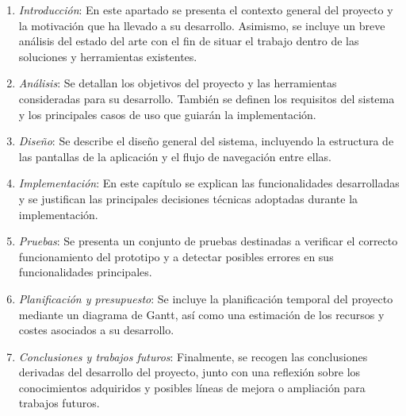 \documentclass[../../main.tex]{subfiles}
\begin{document}
\begin{enumerate}
    \item \textit{Introducción}: En este apartado se presenta el contexto general del proyecto y la motivación que ha llevado a su desarrollo. Asimismo, se incluye un breve análisis del estado del arte con el fin de situar el trabajo dentro de las soluciones y herramientas existentes.
   
    \item \textit{Análisis}: Se detallan los objetivos del proyecto y las herramientas consideradas para su desarrollo. También se definen los requisitos del sistema y los principales casos de uso que guiarán la implementación.

    \item \textit{Diseño}: Se describe el diseño general del sistema, incluyendo la estructura de las pantallas de la aplicación y el flujo de navegación entre ellas.

    \item \textit{Implementación}: En este capítulo se explican las funcionalidades desarrolladas y se justifican las principales decisiones técnicas adoptadas durante la implementación.

    \item \textit{Pruebas}: Se presenta un conjunto de pruebas destinadas a verificar el correcto funcionamiento del prototipo y a detectar posibles errores en sus funcionalidades principales.

    \item \textit{Planificación y presupuesto}: Se incluye la planificación temporal del proyecto mediante un diagrama de Gantt, así como una estimación de los recursos y costes asociados a su desarrollo.

    \item \textit{Conclusiones y trabajos futuros}: Finalmente, se recogen las conclusiones derivadas del desarrollo del proyecto, junto con una reflexión sobre los conocimientos adquiridos y posibles líneas de mejora o ampliación para trabajos futuros.

\end{enumerate}
\end{document}
